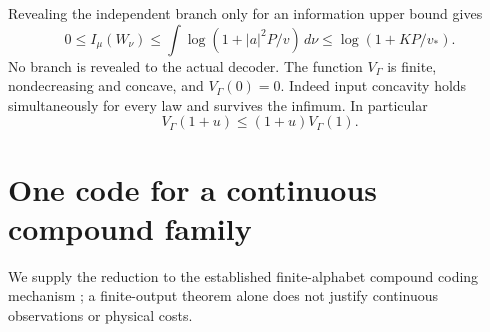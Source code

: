 \documentclass[11pt]{article}
\begin{document}
Revealing the independent branch only for an information upper bound gives
\[
 0\leq I_\mu(W_\nu)
 \leq\int\log(1+|a|^2P/v)\,d\nu
 \leq\log(1+KP/v_*).                                      \tag{7}
\]
No branch is revealed to the actual decoder. The function \(V_\Gamma\)
is finite, nondecreasing and concave, and \(V_\Gamma(0)=0\).
Indeed input concavity holds simultaneously for every law and survives
the infimum. In particular
\[
 V_\Gamma(1+u)\leq(1+u)V_\Gamma(1).                         \tag{8}
\]

\section{One code for a continuous compound family}

We supply the reduction to the established finite-alphabet compound
coding mechanism \cite{types,compound}; a finite-output theorem alone
does not justify continuous observations or physical costs.
\end{document}
